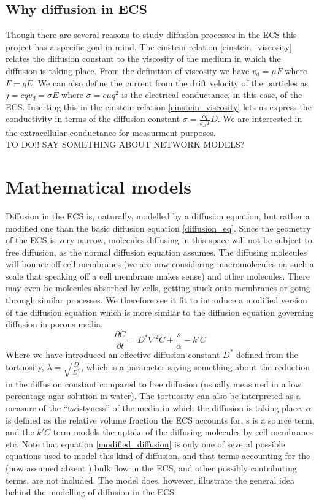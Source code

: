 \documentclass[a4paper,english, 12pt, twoside]{article}
\renewcommand{\d}{\partial}
\begin{document}
\subsection{Why diffusion in ECS}
Though there are several reasons to study diffusion processes in the ECS this project has a specific goal in mind. 
The einstein relation \ref{einstein_viscosity} relates the diffusion constant to the viscosity of the medium in which the diffusion is taking place. 
From the definition of viscosity we have $v_d = \mu F$ where $F = qE$. 
We can also define the current from the drift velocity of the particles as $j = cqv_d = \sigma E$ where $\sigma = c\mu q^2$ is the electrical conductance, in this case, of the ECS. 
Inserting this in the einstein relation \ref{einstein_viscosity} lets us express the conductivity in terms of the diffusion constant $\sigma = \frac{cq}{k_B T}D$. 
We are interrested in the extracellular conductance for measurment purposes. \\
TO DO!! SAY SOMETHING ABOUT NETWORK MODELS?

\section{Mathematical models}
Diffusion in the ECS is, naturally, modelled by a diffusion equation, but rather a modified one than the basic diffusion equation \ref{diffusion_eq}. 
Since the geometry of the ECS is very narrow, molecules diffusing in this space will not be subject to free diffusion, as the normal diffusion equation assumes. 
The diffusing molecules will bounce off cell membranes (we are now considering macromolecules on such a scale that speaking off a cell membrane makes sense) and other molecules. 
There may even be molecules absorbed by cells, getting stuck onto membranes or going through similar processes. 
We therefore see it fit to introduce a modified version of the diffusion equation which is more similar to the diffusion equation governing diffusion in porous media. 
\begin{equation}\label{modified_diffusion}
  \frac{\d C}{\d t} = D^*\nabla^2C +\frac{s}{\alpha} -k'C
\end{equation}
Where we have introduced an effective diffusion constant $D^*$ defined from the tortuosity, $\lambda = \sqrt{\frac{D}{D^*}}$, which is a parameter saying something about the reduction in the diffusion constant compared to free diffusion (usually measured in a low percentage agar solution in water). 
The tortuosity can also be interpreted as a measure of the ``twistyness'' of the media in which the diffusion is taking place. 
$\alpha$ is defined as the relative volume fraction the ECS accounts for, s is a source term, and the $k'C$ term models the uptake of the diffusing molecules by cell membranes etc. 
Note that equation \ref{modified_diffusion} is only one of several possible equations used to model this kind of diffusion, and that terms accounting for the (now assumed absent \cite{}) bulk flow in the ECS, and other possibly contributing terms, are not included. 
The model does, however, illustrate the general idea behind the modelling of diffusion in the ECS.
\end{document}
